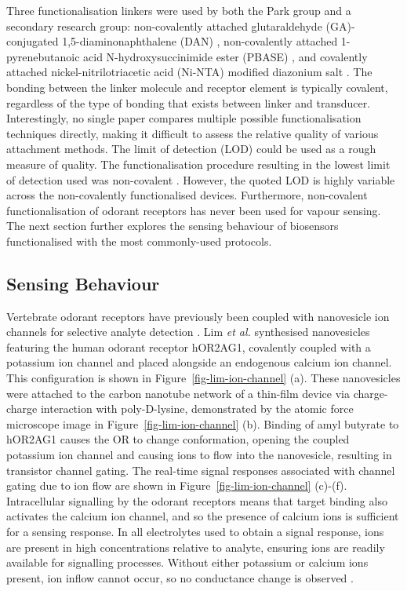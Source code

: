 \documentclass[
  a4paper,
]{scrbook}
\begin{document}
Three functionalisation linkers were used by both the Park group and a
secondary research group: non-covalently attached glutaraldehyde
(GA)-conjugated 1,5-diaminonaphthalene (DAN)
\autocite{Kwon2015,Goodwin2021}, non-covalently attached
1-pyrenebutanoic acid N-hydroxysuccinimide ester (PBASE)
\autocite{Murugathas2020,Yoo2022}, and covalently attached
nickel-nitrilotriacetic acid (Ni-NTA) modified diazonium salt
\autocite{Goldsmith2011,Son2017}. The bonding between the linker
molecule and receptor element is typically covalent, regardless of the
type of bonding that exists between linker and transducer.
Interestingly, no single paper compares multiple possible
functionalisation techniques directly, making it difficult to assess the
relative quality of various attachment methods. The limit of detection
(LOD) could be used as a rough measure of quality. The functionalisation
procedure resulting in the lowest limit of detection used was
non-covalent \autocite{Park2012}. However, the quoted LOD is highly
variable across the non-covalently functionalised devices. Furthermore,
non-covalent functionalisation of odorant receptors has never been used
for vapour sensing. The next section further explores the sensing
behaviour of biosensors functionalised with the most commonly-used
protocols.

\hypertarget{sec-biosensor-methods}{%
\subsection{Sensing Behaviour}\label{sec-biosensor-methods}}

Vertebrate odorant receptors have previously been coupled with
nanovesicle ion channels for selective analyte detection
\autocite{Lim2015,Dung2018}. Lim \emph{et al.} synthesised nanovesicles
featuring the human odorant receptor hOR2AG1, covalently coupled with a
potassium ion channel and placed alongside an endogenous calcium ion
channel. This configuration is shown in Figure~\ref{fig-lim-ion-channel}
(a). These nanovesicles were attached to the carbon nanotube network of
a thin-film device via charge-charge interaction with poly-D-lysine,
demonstrated by the atomic force microscope image in
Figure~\ref{fig-lim-ion-channel} (b). Binding of amyl butyrate to
hOR2AG1 causes the OR to change conformation, opening the coupled
potassium ion channel and causing ions to flow into the nanovesicle,
resulting in transistor channel gating. The real-time signal responses
associated with channel gating due to ion flow are shown in
Figure~\ref{fig-lim-ion-channel} (c)-(f). Intracellular signalling by
the odorant receptors means that target binding also activates the
calcium ion channel, and so the presence of calcium ions is sufficient
for a sensing response. In all electrolytes used to obtain a signal
response, ions are present in high concentrations relative to analyte,
ensuring ions are readily available for signalling processes. Without
either potassium or calcium ions present, ion inflow cannot occur, so no
conductance change is observed \autocite{Lim2015}.
\end{document}
